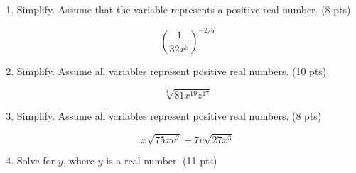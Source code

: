 \documentclass{ximera}
\begin{document}
\begin{enumerate}
(a) Select the statement that is true.
\begin{itemize}
\item Relation A is a function, but Relation B is not.
\item Relation B is a function, but Relation A is not.
\item Both Relation A and Relation B are functions.
\item Neither Relation A nor Relation B are functions.
\end{itemize}
(b) Which of the following represents the domain of Relation A?
\begin{itemize}
\item $[1,2]$
\item $\{-1,1,2\}$
\item $[1,4]$
\item $\{0,1,2,3,4\}$
\end{itemize}
(c) Which of the following represents the range of Relation B?
\begin{itemize}
\item $\{1,2,3\}$
\item $[1,3)$
\item $\{1,2,3,4\}$
\item $(1,4)$
\end{itemize}
(d) Fill in the blank so that the ordered pair $(x, y)$ is included in Relation B: ( $\_\_\_\_$ 2). Select your answer from the options below.
\begin{itemize}
\item 1
\item 2
\item 3
\item 4
\end{itemize}

\item Simplify. Assume that the variable represents a positive real number. (8 pts)

$$\left(\frac{1}{32 x^{5}}\right)^{-2 / 5}$$

\item Simplify. Assume all variables represent positive real numbers. (10 pts)

$$\sqrt[4]{81 x^{19} z^{17}}$$

\item Simplify. Assume all variables represent positive real numbers. (8 pts)

$$x \sqrt{75 x v^{2}}+7 v \sqrt{27 x^{3}}$$

\item Solve for $y$, where $y$ is a real number. (11 pts)


\end{enumerate}
\end{document}
